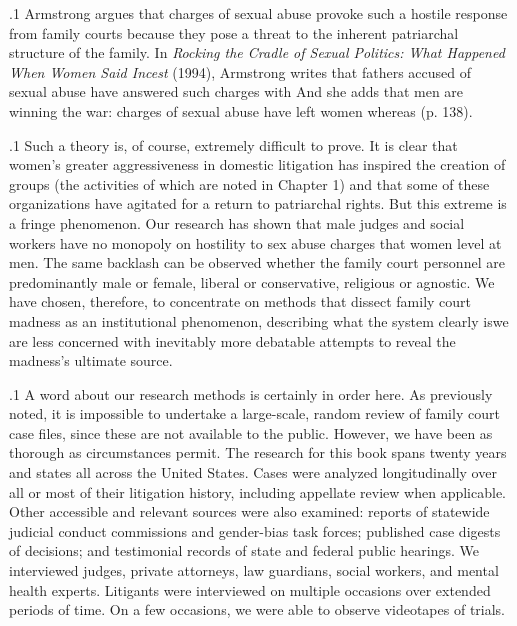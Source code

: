 \documentclass[11pt, twoside]{article}
\begin{document}
{\p.1{%
Armstrong argues that charges of sexual abuse provoke such a hostile
response from family courts because they pose a threat to the inherent
patriarchal structure of the family. In
\textit{Rocking the Cradle of Sexual Politics: What
Happened When Women Said Incest} (1994), Armstrong writes
that fathers accused of sexual abuse have answered such charges with  And she adds that men are
winning the war: charges of sexual abuse have left women  whereas  (p. 138).
}%

\p.1{%
Such a theory is, of course, extremely difficult to prove. It is clear that
women’s greater aggressiveness in domestic litigation has inspired the
creation of  groups (the activities of which are noted
in Chapter 1) and that some of these organizations have agitated for
a return to  patriarchal rights. But this extreme is a fringe
phenomenon. Our research has shown that male judges and social workers have no monopoly on hostility to sex abuse charges that women
level at men. The same backlash can be observed whether the family
court personnel are predominantly male or female, liberal or conservative, religious or agnostic. We have chosen, therefore, to concentrate
on methods that dissect family court madness as an institutional phenomenon, describing what the system clearly is\mdash{}we are less concerned
with inevitably more debatable attempts to reveal the madness’s ultimate
source.
}%

\p.1{%
A word about our research methods is certainly in order here.
As previously noted, it is impossible to undertake a large-scale,
random review of family court case files, since these are not available
to the public. However, we have been as thorough as circumstances
permit. The research for this book spans twenty years and states all
across the United States. Cases were analyzed longitudinally over all
or most of their litigation history, including appellate review when
applicable. Other accessible and relevant sources were also examined:
reports of statewide judicial conduct commissions and gender-bias task
forces; published case digests of decisions; and testimonial records
of state and federal public hearings. We interviewed judges, private
attorneys, law guardians, social workers, and mental health experts. Litigants were interviewed on multiple occasions over extended periods
of time. On a few occasions, we were able to observe videotapes of
trials.
}%

}
\end{document}
